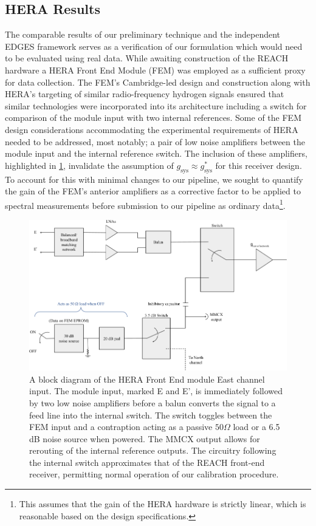 \subsection{HERA Results}\label{sec:hera_results}
The comparable results of our preliminary technique and the independent EDGES framework serves as a verification of our formulation which would need to be evaluated using real data. While awaiting construction of the REACH hardware a HERA Front End Module (FEM) was employed as a sufficient proxy for data collection. The FEM’s Cambridge-led design and construction along with HERA’s targeting of similar radio-frequency hydrogen signals ensured that similar technologies were incorporated into its architecture including a switch for comparison of the module input with two internal references. Some of the FEM design considerations accommodating the experimental requirements of HERA needed to be addressed, most notably; a pair of low noise amplifiers between the module input and the internal reference switch. The inclusion of these amplifiers, highlighted in \cref{fig:fem_block}, invalidate the assumption of $g_{\mathrm{sys}} \approx g_{\mathrm{sys}}^*$ for this receiver design. To account for this with minimal changes to our pipeline, we sought to quantify the gain of the FEM’s anterior amplifiers as a corrective factor to be applied to spectral measurements before submission to our pipeline as ordinary data\footnote{This assumes that the gain of the HERA hardware is strictly linear, which is reasonable based on the design specifications.}.
\begin{figure}
    \centering
    \includegraphics[width=.8\textwidth]{fem_block}
    \caption{A block diagram of the HERA Front End module East channel input. The module input, marked E and E', is immediately followed by two low noise amplifiers before a balun converts the signal to a feed line into the internal switch. The switch toggles between the FEM input and a contraption acting as a passive $50 \Omega$ load or a 6.5 dB noise source when powered. The MMCX output allows for rerouting of the internal reference outputs. The circuitry following the internal switch approximates that of the REACH front-end receiver, permitting normal operation of our calibration procedure.}
    \label{fig:fem_block}
\end{figure}

